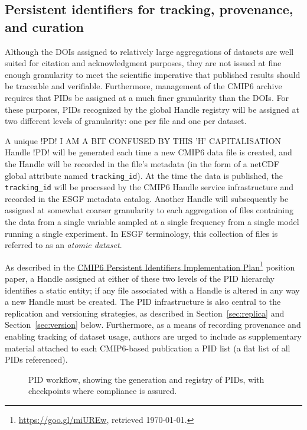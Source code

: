 \documentclass[gmd,manuscript]{copernicus}
\newcommand{\urlref}[2] {\href{#1}{#2}\footnote{\url{#1}, retrieved \today.}}
\begin{document}
\subsection{Persistent identifiers for tracking, provenance, and
  curation}
\label{sec:pid}

Although the DOIs assigned to relatively large aggregations of
datasets are well suited for citation and acknowledgment purposes,
they are not issued at fine enough granularity to meet the scientific
imperative that published results should be traceable and verifiable.
Furthermore, management of the CMIP6 archive requires that PIDs be
assigned at a much finer granularity than the DOIs. For these
purposes, PIDs recognized by the global Handle registry will be
assigned at two different levels of granularity: one per file and 
one per dataset.

A unique
!PD! I AM A BIT CONFUSED BY THIS 'H' CAPITALISATION Handle !PD!
will be generated each time a new CMIP6 data file is
created, and the Handle will be recorded in the file's metadata (in
the form of a netCDF global attribute named \texttt{tracking\_id}). At
the time the data is published, the \texttt{tracking\_id} will be
processed by the CMIP6 Handle service infrastructure and recorded in
the ESGF metadata catalog. Another Handle will subsequently be
assigned at somewhat coarser granularity to each aggregation of files
containing the data from a single variable sampled at a single
frequency
from a single model running a single experiment. In ESGF terminology,
this collection of files is referred to as an \emph{atomic dataset}.

As described in the \urlref{https://goo.gl/miUREw}{CMIP6 Persistent
Identifiers Implementation Plan} position paper, a Handle assigned
at either of these two levels of the PID hierarchy identifies a static
entity; if any file associated with a Handle is altered in any way a
new Handle must be created. The PID infrastructure is also central to
the replication and versioning strategies, as described in
Section~\ref{sec:replica} and Section~\ref{sec:version} below.
Furthermore, as a means of recording provenance and enabling tracking
of dataset usage, authors are urged to include as supplementary
material attached to each CMIP6-based publication a PID list (a flat
list of all PIDs referenced).

\begin{figure*}
  \begin{center}
  \end{center}
  \caption{PID workflow, showing the generation and registry of PIDs,
    with checkpoints where compliance is assured.}
  \label{fig:pidflow}
\end{figure*}
\end{document}
